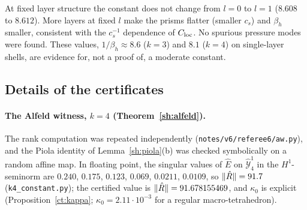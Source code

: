 At fixed layer structure the constant does not change from $l=0$ to $l=1$ ($8.608$ to $8.612$). More layers at fixed $l$ make the prisms flatter (smaller $c_s$) and $\beta_h$ smaller, consistent with the $c_s^{-1}$ dependence of $C_{\rm loc}$. No spurious pressure modes were found. These values, $1/\beta_h\approx8.6$ ($k=3$) and $8.1$ ($k=4$) on single-layer shells, are evidence for, not a proof of, a moderate constant.

\subsection{Details of the certificates}\label{app:cert}
\paragraph{The Alfeld witness, $k=4$ (Theorem~\ref{sh:alfeld}).} The rank computation was repeated independently (\texttt{notes/v6/referee6/aw.py}), and the Piola identity of Lemma~\ref{sh:piola}(b) was checked symbolically on a random affine map. In floating point, the singular values of $\hat E$ on $\hat{\mathcal Y}^1_4$ in the $H^1$-seminorm are $0.240$, $0.175$, $0.123$, $0.069$, $0.0211$, $0.0109$, so $\lVert \hat R\rVert=91.7$ (\texttt{k4\_constant.py}); the certified value is $\lVert \hat R\rVert=91.678155469$, and $\kappa_0$ is explicit (Proposition~\ref{ct:kappa}; $\kappa_0=2.11\cdot10^{-3}$ for a regular macro-tetrahedron).

